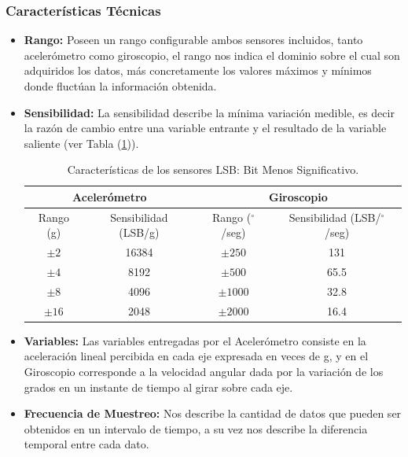 \documentclass[12pt,a4paper]{article}
\newcommand{\grad}{$^{\circ}$}
\begin{document}
\newpage
\subsubsection{Características Técnicas}

\begin{itemize}
	
	\item \textbf{Rango:} Poseen un rango configurable ambos sensores incluidos, tanto acelerómetro como giroscopio, el rango nos indica el dominio sobre el cual son adquiridos los datos, más concretamente los valores máximos y mínimos donde fluctúan la información obtenida.
	
	\item \textbf{Sensibilidad:} La sensibilidad describe la mínima variación medible, es decir la razón de cambio entre una variable entrante y el resultado de la variable saliente (ver Tabla (\ref{table:caracteristicasSensor})).
	
	\begin{table}[H]
		\centering
		\caption{Características de los sensores LSB: Bit Menos Significativo.}
		\begin{tabular}{|c|c|c|c|}
			\hline
			\multicolumn{2}{|c|}{Acelerómetro} &\multicolumn{2}{|c|}{Giroscopio}   \\
			\hline
			Rango (g)        & Sensibilidad (LSB/g)  & Rango (\grad/seg)     & Sensibilidad (LSB/\grad/seg)\\ \hline
			$\pm 2$     &  16384 & $\pm 250 $  	& 	131      	\\ 
			$\pm 4$     &  8192  & $\pm 500 $ 	& 	65.5     	\\
			$\pm 8$     &  4096  & $\pm 1000$  	& 	32.8       	\\
			$\pm 16$    &  2048  & $\pm 2000$   & 	16.4      	\\ 
			\hline
		\end{tabular}
		\label{table:caracteristicasSensor}
	\end{table}
	
	\item \textbf{Variables:} Las variables entregadas por el Acelerómetro consiste en la aceleración lineal percibida en cada eje expresada en veces de g, y en el Giroscopio corresponde  a la velocidad angular dada por la variación de los grados en un instante de tiempo al girar sobre cada eje.
	
	\item \textbf{Frecuencia de Muestreo:} Nos describe la cantidad de datos que pueden ser obtenidos en un intervalo de tiempo, a su vez nos describe la diferencia temporal entre cada dato.
	

\end{itemize}
\end{document}
